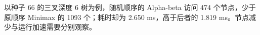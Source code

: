 以种子 66 的三叉深度 6 树为例，随机顺序的 Alpha-beta 访问 474 个节点，少于原顺序 Minimax 的 1093 个；耗时却为 2.650 ms，高于后者的 1.819 ms。节点减少与运行加速需要分别观察。
